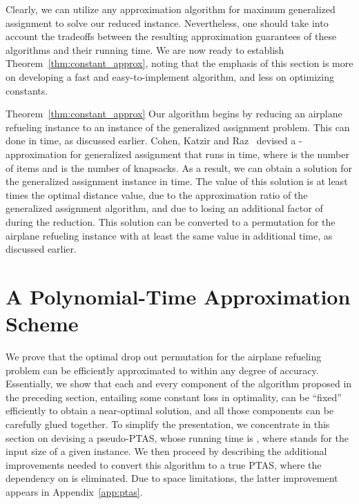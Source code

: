 \documentclass[11pt]{article}
\theoremstyle{plain}
\theoremstyle{definition}
\begin{document}
\smallskip {} Clearly, we can utilize any approximation algorithm for maximum generalized assignment to solve our reduced instance. Nevertheless, one should take into account the tradeoffs between the resulting approximation guarantees of these algorithms and their running time. We are now ready to establish Theorem~\ref{thm:constant_approx}, noting that the emphasis of this section is more on developing a fast and easy-to-implement algorithm, and less on optimizing constants.

\begin{proofof}{Theorem~\ref{thm:constant_approx}}
Our algorithm begins by reducing an airplane refueling instance to an instance of the generalized assignment problem. This can done in  time, as discussed earlier. Cohen, Katzir and Raz~\cite{CohenKR06} devised a -approximation for generalized assignment that runs in  time, where  is the number of items and  is the number of knapsacks. As a result, we can obtain a solution for the generalized assignment instance in  time. The value of this solution is at least  times the optimal distance value, due to the approximation ratio of the generalized assignment algorithm, and due to losing an additional factor of  during the reduction. This solution can be converted to a permutation for the airplane refueling instance with at least the same value in additional  time, as discussed earlier.
\end{proofof}



\section{A Polynomial-Time Approximation Scheme} \label{sec:ptas}

We prove that the optimal drop out permutation for the airplane refueling problem can be efficiently approximated to within any degree of accuracy. Essentially, we show that each and every component of the algorithm proposed in the preceding section, entailing some constant loss in optimality, can be ``fixed'' efficiently to obtain a near-optimal solution, and all those components can be carefully glued together. To simplify the presentation, we concentrate in this section on devising a pseudo-PTAS, whose running time is , where  stands for the input size of a given instance. We then proceed by describing the additional improvements needed to convert this algorithm to a true PTAS, where the dependency on  is eliminated. Due to space limitations, the latter improvement appears in Appendix~\ref{app:ptas}.
\end{document}

